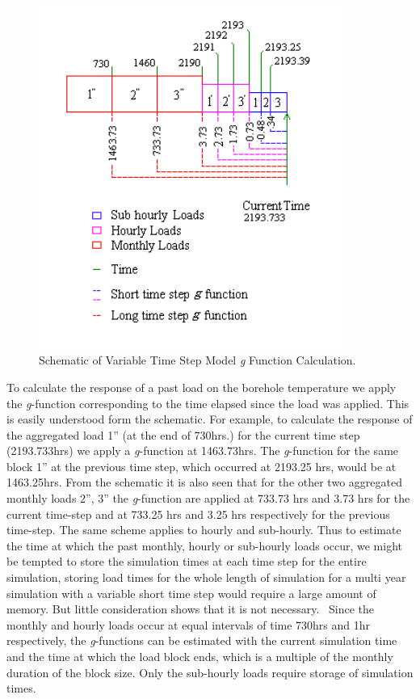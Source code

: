 \begin{figure}[hbtp] %
\centering
\includegraphics[width=0.9\textwidth, height=0.9\textheight, keepaspectratio=true]{media/image5656.png}
\caption{Schematic of Variable Time Step Model \emph{g} Function Calculation. \protect \label{fig:schematic-of-variable-time-step-model-g}}
\end{figure}

To calculate the response of a past load on the borehole temperature we apply the \emph{g}-function corresponding to the time elapsed since the load was applied. This is easily understood form the schematic. For example, to calculate the response of the aggregated load 1'' (at the end of 730hrs.) for the current time step (2193.733hrs) we apply a \emph{g}-function at 1463.73hrs. The \emph{g}-function for the same block 1'' at the previous time step, which occurred at 2193.25 hrs, would be at 1463.25hrs. From the schematic it is also seen that for the other two aggregated monthly loads 2'', 3'' the \emph{g}-function are applied at 733.73 hrs and 3.73 hrs for the current time-step and at 733.25 hrs and 3.25 hrs respectively for the previous time-step. The same scheme applies to hourly and sub-hourly. Thus to estimate the time at which the past monthly, hourly or sub-hourly loads occur, we might be tempted to store the simulation times at each time step for the entire simulation, storing load times for the whole length of simulation for a multi year simulation with a variable short time step would require a large amount of memory. But little consideration shows that it is not necessary.~ Since the monthly and hourly loads occur at equal intervals of time 730hrs and 1hr respectively, the \emph{g}-functions can be estimated with the current simulation time and the time at which the load block ends, which is a multiple of the monthly duration of the block size. Only the sub-hourly loads require storage of simulation times.

